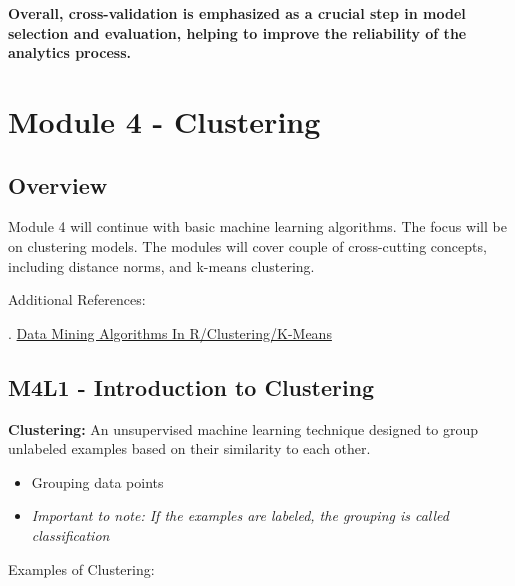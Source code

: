 \documentclass[
]{book}
\providecommand{\tightlist}{%
  \setlength{\itemsep}{0pt}\setlength{\parskip}{0pt}}
\begin{document}
\textbf{Overall, cross-validation is emphasized as a crucial step in model selection and evaluation, helping to improve the reliability of the analytics process.}

\chapter{Module 4 - Clustering}\label{module-4---clustering}

\section{Overview}\label{overview-1}

Module 4 will continue with basic machine learning algorithms.
The focus will be on clustering models.
The modules will cover couple of cross-cutting concepts, including distance norms, and k-means clustering.

Additional References:

. \href{https://en.wikibooks.org/wiki/Data_Mining_Algorithms_In_R/Clustering/K-Means}{Data Mining Algorithms In R/Clustering/K-Means}

\section{M4L1 - Introduction to Clustering}\label{m4l1---introduction-to-clustering}

\textbf{Clustering:} An unsupervised machine learning technique designed to group unlabeled examples based on their similarity to each other.

\begin{itemize}
\tightlist
\item
  Grouping data points
\item
  \emph{Important to note: If the examples are labeled, the grouping is called classification}
\end{itemize}

Examples of Clustering:
\end{document}
